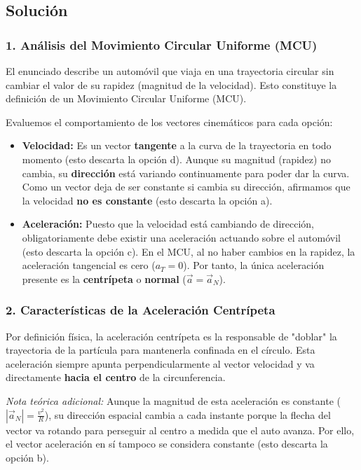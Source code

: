 \documentclass[12pt, a4paper]{article}
\begin{document}
\subsection*{Solución}

\subsubsection*{1. Análisis del Movimiento Circular Uniforme (MCU)}
El enunciado describe un automóvil que viaja en una trayectoria circular sin cambiar el valor de su rapidez (magnitud de la velocidad). Esto constituye la definición de un Movimiento Circular Uniforme (MCU).

Evaluemos el comportamiento de los vectores cinemáticos para cada opción:
\begin{itemize}
    \item \textbf{Velocidad:} Es un vector \textbf{tangente} a la curva de la trayectoria en todo momento (esto descarta la opción d). Aunque su magnitud (rapidez) no cambia, su \textbf{dirección} está variando continuamente para poder dar la curva. Como un vector deja de ser constante si cambia su dirección, afirmamos que la velocidad \textbf{no es constante} (esto descarta la opción a).
    \item \textbf{Aceleración:} Puesto que la velocidad está cambiando de dirección, obligatoriamente debe existir una aceleración actuando sobre el automóvil (esto descarta la opción c). En el MCU, al no haber cambios en la rapidez, la aceleración tangencial es cero ($a_T = 0$). Por tanto, la única aceleración presente es la \textbf{centrípeta} o \textbf{normal} ($\vec{a} = \vec{a}_N$).
\end{itemize}

\subsubsection*{2. Características de la Aceleración Centrípeta}
Por definición física, la aceleración centrípeta es la responsable de "doblar" la trayectoria de la partícula para mantenerla confinada en el círculo. Esta aceleración siempre apunta perpendicularmente al vector velocidad y va directamente \textbf{hacia el centro} de la circunferencia.
    
\textit{Nota teórica adicional:} Aunque la magnitud de esta aceleración es constante ($|\vec{a}_N| = \frac{v^2}{R}$), su dirección espacial cambia a cada instante porque la flecha del vector va rotando para perseguir al centro a medida que el auto avanza. Por ello, el vector aceleración en sí tampoco se considera constante (esto descarta la opción b).
\end{document}
